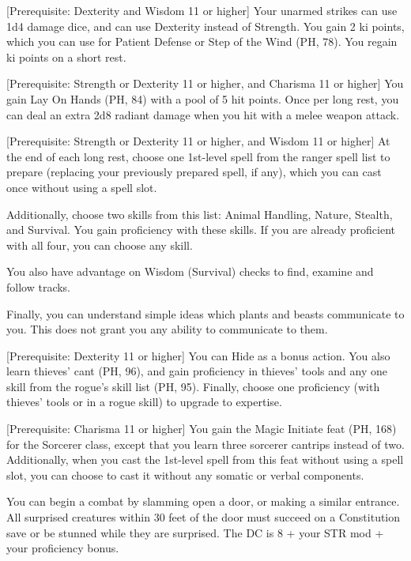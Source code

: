 \documentclass[letterpaper,twocolumn,openany,nodeprecatedcode,bg=print]{dndbook}
\begin{document}
[Prerequisite: Dexterity and Wisdom 11 or higher]
\label{monk-initiate}
Your unarmed strikes can use 1d4 damage dice, and can use Dexterity instead of Strength. 
You gain 2 ki points, which you can use for Patient Defense or Step of the Wind (PH, 78). 
You regain ki points on a short rest.

[Prerequisite: Strength or Dexterity 11 or higher, and Charisma 11 or higher]
\label{paladin-initiate}
You gain Lay On Hands (PH, 84) with a pool of 5 hit points. 
Once per long rest, you can deal an extra 2d8 radiant damage when you hit with a melee weapon attack.

[Prerequisite: Strength or Dexterity 11 or higher, and Wisdom 11 or higher]
\label{ranger-initiate}
At the end of each long rest, choose one 1st-level spell from the ranger spell list to prepare (replacing your previously prepared spell, if any), which you can cast once without using a spell slot. 

Additionally, choose two skills from this list: Animal Handling, Nature, Stealth, and Survival. 
You gain proficiency with these skills. 
If you are already proficient with all four, you can choose any skill.

You also have advantage on Wisdom (Survival) checks to find, examine and follow tracks.

Finally, you can understand simple ideas which plants and beasts communicate to you. 
This does not grant you any ability to communicate to them.

[Prerequisite: Dexterity 11 or higher]
\label{rogue-initiate}
You can Hide as a bonus action. 
You also learn thieves' cant (PH, 96), and gain proficiency in thieves' tools and any one skill from the rogue's skill list (PH, 95). 
Finally, choose one proficiency (with thieves' tools or in a rogue skill) to upgrade to expertise.

[Prerequisite: Charisma 11 or higher]
\label{sorcerer-initiate}
You gain the Magic Initiate feat (PH, 168) for the Sorcerer class, except that you learn three sorcerer cantrips instead of two. 
Additionally, when you cast the 1st-level spell from this feat without using a spell slot, you can choose to cast it without any somatic or verbal components.

\label{stunning-irruption}
You can begin a combat by slamming open a door, or making a similar entrance. 
All surprised creatures within 30 feet of the door must succeed on a Constitution save or be stunned while they are surprised. 
The DC is 8 + your STR mod + your proficiency bonus.
\end{document}
